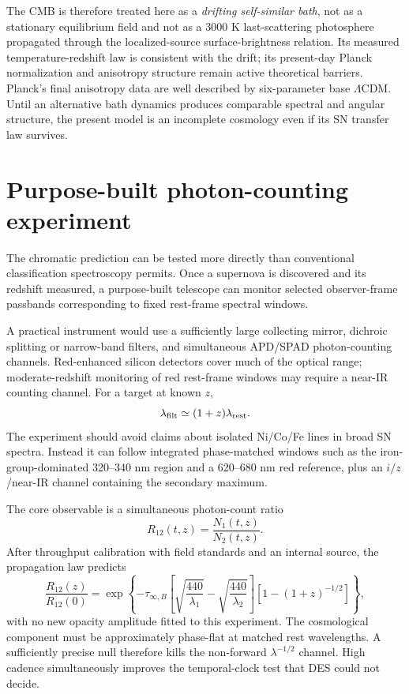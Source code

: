 \documentclass[11pt]{article}
\newcommand{\LCDM}{$\Lambda$CDM}
\newcommand{\tauinf}{\tau_{\infty,B}}
\begin{document}
The CMB is therefore treated here as a \emph{drifting self-similar bath}, not as a stationary equilibrium field and not as a 3000 K last-scattering photosphere propagated through the localized-source surface-brightness relation. Its measured temperature-redshift law is consistent with the drift; its present-day Planck normalization and anisotropy structure remain active theoretical barriers. Planck's final anisotropy data are well described by six-parameter base \LCDM \citep{Planck2018}. Until an alternative bath dynamics produces comparable spectral and angular structure, the present model is an incomplete cosmology even if its SN transfer law survives.

\section{Purpose-built photon-counting experiment}
The chromatic prediction can be tested more directly than conventional classification spectroscopy permits. Once a supernova is discovered and its redshift measured, a purpose-built telescope can monitor selected observer-frame passbands corresponding to fixed rest-frame spectral windows.

A practical instrument would use a sufficiently large collecting mirror, dichroic splitting or narrow-band filters, and simultaneous APD/SPAD photon-counting channels. Red-enhanced silicon detectors cover much of the optical range; moderate-redshift monitoring of red rest-frame windows may require a near-IR counting channel. For a target at known $z$,
\begin{equation}
 \lambda_{\rm filt}\simeq(1+z)\lambda_{\rm rest}.
\end{equation}
The experiment should avoid claims about isolated Ni/Co/Fe lines in broad SN spectra. Instead it can follow integrated phase-matched windows such as the iron-group-dominated 320--340 nm region and a 620--680 nm red reference, plus an $i/z$/near-IR channel containing the secondary maximum.

The core observable is a simultaneous photon-count ratio
\begin{equation}
 R_{12}(t,z)=\frac{N_1(t,z)}{N_2(t,z)}.
\end{equation}
After throughput calibration with field standards and an internal source, the propagation law predicts
\begin{equation}
 \frac{R_{12}(z)}{R_{12}(0)}=
 \exp\left\{-\tauinf\left[\sqrt{\frac{440}{\lambda_1}}-\sqrt{\frac{440}{\lambda_2}}\right]
 \left[1-(1+z)^{-1/2}\right]\right\},
 \label{eq:instrument}
\end{equation}
with no new opacity amplitude fitted to this experiment. The cosmological component must be approximately phase-flat at matched rest wavelengths. A sufficiently precise null therefore kills the non-forward $\lambda^{-1/2}$ channel. High cadence simultaneously improves the temporal-clock test that DES could not decide.
\end{document}
